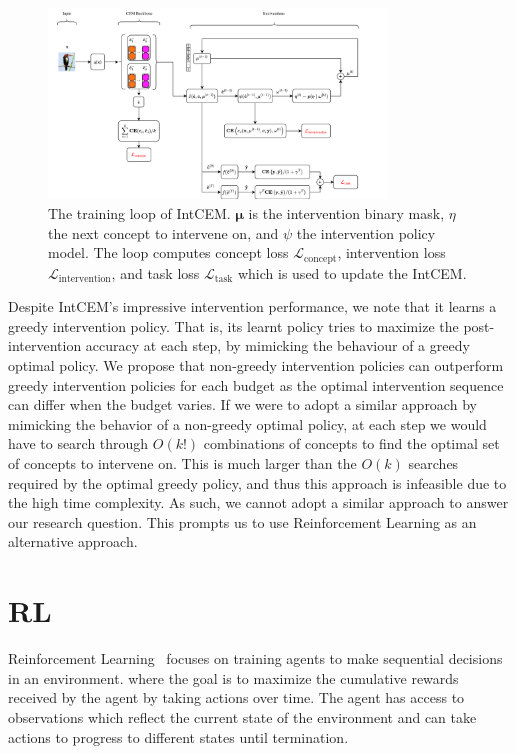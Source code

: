 \begin{figure}[!ht]
    \centering
    \includegraphics[width=0.8\textwidth]{figs/background/intcem.png}
    \caption{The training loop of IntCEM. $\bm{\mu}$ is the intervention binary mask,
    $\eta$ the next concept to intervene on, and $\psi$ the intervention policy model.
    The loop computes concept loss $\mathcal{L}_{\text{concept}}$,
    intervention loss $\mathcal{L}_{\text{intervention}}$, and task loss $\mathcal{L}_{\text{task}}$ which is used to update the
    IntCEM.}
    \label{fig:intcem}
\end{figure}

Despite IntCEM's impressive intervention performance,
we note that it learns a greedy intervention policy.
That is, its learnt policy tries to maximize the 
post-intervention accuracy at each step, 
by mimicking the behaviour of a greedy optimal policy. We propose that
non-greedy intervention policies can outperform greedy intervention policies
for each budget as the optimal intervention sequence can differ when the budget
varies. If we were to adopt a similar approach by mimicking the behavior of a 
non-greedy optimal policy,
at each step we would have to search through
$O(k!)$ combinations of concepts
to find the optimal set of concepts to intervene on. This is much larger
than the $O(k)$ searches required by the optimal greedy policy, and 
thus this approach is infeasible due to the high time complexity.
As such, we cannot adopt a similar approach to answer our research question.
This prompts us to use Reinforcement Learning as an alternative approach.

\section{RL}\label{background:rl} %
Reinforcement Learning~\cite{rl} focuses on
 training agents to make sequential decisions in an environment.
where the goal is to maximize the cumulative rewards received by the agent
by taking actions over time. 
The agent has access to observations which reflect the current state
 of the environment and can take actions to progress to different states until termination.

